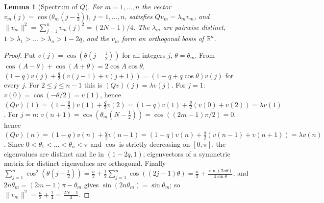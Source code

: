 \documentclass[11pt,a4paper]{article}
\newtheorem{lemma}[theorem]{Lemma}
\theoremstyle{definition}
\theoremstyle{remark}
\newcommand{\R}{\mathbb{R}}
\begin{document}
\begin{lemma}[Spectrum of $Q$]\label{lem:spec}
For $m=1,\dots,n$ the vector $v_m(j)=\cos\bigl(\theta_m(j-\tfrac12)\bigr)$, $j=1,\dots,n$, satisfies
$Qv_m=\lambda_mv_m$, and $\|v_m\|^2=\sum_{j=1}^n v_m(j)^2=(2N-1)/4$. The $\lambda_m$ are pairwise distinct,
$1>\lambda_1>\dots>\lambda_n>1-2q$, and the $v_m$ form an orthogonal basis of $\R^n$.
\end{lemma}
\begin{proof}
Put $v(j)=\cos(\theta(j-\frac12))$ for all integers $j$, $\theta=\theta_m$. From
$\cos(A-\theta)+\cos(A+\theta)=2\cos A\cos\theta$,
$(1-q)v(j)+\frac q2(v(j-1)+v(j+1))=(1-q+q\cos\theta)v(j)$ for every $j$. For $2\le j\le n-1$ this is
$(Qv)(j)=\lambda v(j)$. For $j=1$: $v(0)=\cos(-\theta/2)=v(1)$, hence
$(Qv)(1)=(1-\frac q2)v(1)+\frac q2v(2)=(1-q)v(1)+\frac q2(v(0)+v(2))=\lambda v(1)$. For $j=n$:
$v(n+1)=\cos(\theta_m(N-\frac12))=\cos((2m-1)\pi/2)=0$, hence
$(Qv)(n)=(1-q)v(n)+\frac q2v(n-1)=(1-q)v(n)+\frac q2(v(n-1)+v(n+1))=\lambda v(n)$.
Since $0<\theta_1<\dots<\theta_n<\pi$ and $\cos$ is strictly decreasing on $[0,\pi]$, the eigenvalues are distinct
and lie in $(1-2q,1)$; eigenvectors of a symmetric matrix for distinct eigenvalues are orthogonal.
Finally $\sum_{j=1}^n\cos^2(\theta(j-\frac12))=\frac n2+\frac12\sum_{j=1}^n\cos((2j-1)\theta)
=\frac n2+\frac{\sin(2n\theta)}{4\sin\theta}$, and $2n\theta_m=(2m-1)\pi-\theta_m$ gives
$\sin(2n\theta_m)=\sin\theta_m$; so $\|v_m\|^2=\frac n2+\frac14=\frac{2N-1}4$.
\end{proof}
\end{document}
